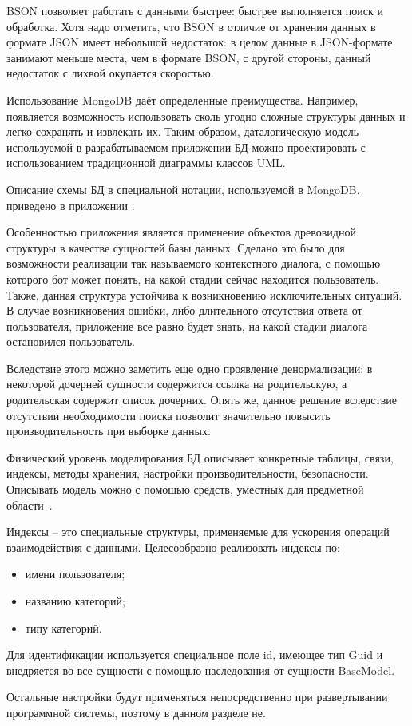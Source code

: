 BSON позволяет работать с данными быстрее: быстрее выполняется поиск и обработка. Хотя надо отметить, что BSON в отличие от хранения данных в формате JSON имеет небольшой недостаток: в целом данные в JSON-формате занимают меньше места, чем в формате BSON, с другой стороны, данный недостаток с лихвой окупается скоростью.

Использование MongoDB даёт определенные преимущества. Например, появляется возможность использовать сколь угодно сложные структуры данных и легко сохранять и извлекать их. Таким образом, даталогическую модель используемой в разрабатываемом приложении БД можно проектировать с использованием традиционной диаграммы классов UML.

Описание схемы БД в специальной нотации, используемой в MongoDB, приведено в приложении \dbschemeappendix.

Особенностью приложения является применение объектов древовидной структуры в качестве сущностей базы данных. Сделано это было для возможности реализации так называемого контекстного диалога, с помощью которого бот может понять, на какой стадии сейчас находится пользователь. Также, данная структура устойчива к возникновению исключительных ситуаций. В случае возникновения ошибки, либо длительного отсутствия ответа от пользователя, приложение все равно будет знать, на какой стадии диалога остановился пользователь. 

Вследствие этого можно заметить еще одно проявление денормализации: в некоторой дочерней сущности содержится ссылка на родительскую, а родительская содержит список дочерних. Опять же, данное решение вследствие отсутствии необходимости поиска позволит значительно повысить производительность при выборке данных.

Физический уровень моделирования БД описывает конкретные таблицы, связи, индексы, методы хранения, настройки производительности, безопасности. Описывать модель можно с помощью средств, уместных для предметной области~\cite{kulikov_db_workbook}. 

Индексы -- это специальные структуры, применяемые для ускорения операций взаимодействия с данными. Целесообразно реализовать индексы по:

\begin{itemize}
	\item имени пользователя;
	\item названию категорий;
	\item типу категорий.
\end{itemize}

Для идентификации используется специальное поле id, имеющее тип Guid и внедряется во все сущности с помощью наследования от сущности BaseModel.

Остальные настройки будут применяться непосредственно при развертывании программной системы, поэтому в данном разделе не.
